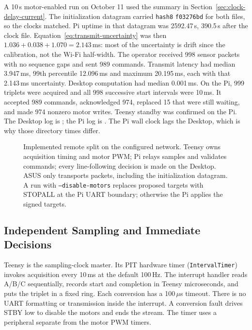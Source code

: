A 10\,s motor-enabled run on October 11 used the summary in Section~\ref{sec:clock-delay-current}. The initialization datagram carried \texttt{hash8} \texttt{f03276bd} for both files, so the clocks matched. Pi uptime in that datagram was 2592.47\,s, 390.5\,s after the clock file. Equation~\eqref{eq:transmit-uncertainty} was then $1.036+0.038+1.070=2.143$\,ms: most of the uncertainty is drift since the calibration, not the Wi-Fi half-width. The operator received 998 sensor packets with no sequence gaps and sent 989 commands. Transmit latency had median 3.947\,ms, 99th percentile 12.096\,ms and maximum 20.195\,ms, each with that 2.143\,ms uncertainty. Desktop computation had median 0.001\,ms. On the Pi, 999 triplets were acquired and all 998 successive start intervals were 10\,ms. It accepted 989 commands, acknowledged 974, replaced 15 that were still waiting, and made 974 nonzero motor writes. Teensy standby was confirmed on the Pi. The Desktop log is ; the Pi log is . The Pi wall clock lags the Desktop, which is why those directory times differ.

\begin{figure}[H]
\centering

\caption{Implemented remote split on the configured network. Teensy owns acquisition timing and motor PWM; Pi relays samples and validates commands; every line-following decision is made on the Desktop. ASUS only transports packets, including the initialization datagram. A run with \texttt{--disable-motors} replaces proposed targets with STOPALL at the Pi UART boundary; otherwise the Pi applies the signed targets.}
\label{fig:remote-topology}
\end{figure}

\clearpage
\subsection{Independent Sampling and Immediate Decisions}
Teensy is the sampling-clock master. Its PIT hardware timer (\texttt{IntervalTimer}) invokes acquisition every 10\,ms at the default 100\,Hz. The interrupt handler reads A/B/C sequentially, records start and completion in Teensy microseconds, and puts the triplet in a fixed ring. Each conversion has a 100\,$\mu$s timeout. There is no UART formatting or transmission inside the interrupt. A conversion fault drives STBY low to disable the motors and ends the stream. The timer uses a peripheral separate from the motor PWM timers.

